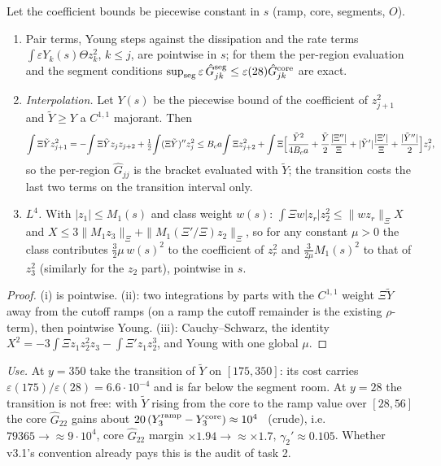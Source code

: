 \documentclass[11pt]{article}
\theoremstyle{definition}\newtheorem{definition}[theorem]{Definition}
\theoremstyle{remark}\newtheorem{remark}[theorem]{Remark}
\begin{document}
\begin{lemma}\label{lem:loc}
Let the coefficient bounds be piecewise constant in $s$ (ramp, core, segments, $O$).
\begin{enumerate}[label=(\roman*),leftmargin=2em,itemsep=2pt]
\item Pair terms, Young steps against the dissipation and the rate terms $\int\varepsilon Y_k(s)\Theta z_k^2$, $k\le j$, are pointwise in $s$; for them the per-region evaluation and the segment conditions $\sup_{\rm seg}\varepsilon\,\hat G^{\rm seg}_{jk}\le\varepsilon(28)\hat G^{\rm core}_{jk}$ are exact.
\item \emph{Interpolation.} Let $Y(s)$ be the piecewise bound of the coefficient of $z_{j+1}^2$ and $\tilde Y\ge Y$ a $C^{1,1}$ majorant. Then
\[
\int\Xi\tilde Yz_{j+1}^2=-\!\int\Xi\tilde Yz_jz_{j+2}+\tfrac12\!\int(\Xi\tilde Y)''z_j^2\le B_ca\!\int\Xi z_{j+2}^2+\int\Xi\Bigl[\frac{\tilde Y^2}{4B_ca}+\frac{\tilde Y}2\frac{|\Xi''|}{\Xi}+|\tilde Y'|\frac{|\Xi'|}{\Xi}+\frac{|\tilde Y''|}2\Bigr]z_j^2 ,
\]
so the per-region $\hat G_{jj}$ is the bracket evaluated with $\tilde Y$; the transition costs the last two terms on the transition interval only.
\item \emph{$L^4$.} With $|z_1|\le M_1(s)$ and class weight $w(s)$: $\int\Xi w|z_r|z_2^2\le\|wz_r\|_\Xi X$ and $X\le3\|M_1z_3\|_\Xi+\|M_1(\Xi'/\Xi)z_2\|_\Xi$, so for any constant $\mu>0$ the class contributes $\frac32\mu\,w(s)^2$ to the coefficient of $z_r^2$ and $\frac3{2\mu}M_1(s)^2$ to that of $z_3^2$ \textup{(}similarly for the $z_2$ part\textup{)}, pointwise in $s$.
\end{enumerate}
\end{lemma}
\begin{proof}
(i) is pointwise. (ii): two integrations by parts with the $C^{1,1}$ weight $\Xi\tilde Y$ away from the cutoff ramps (on a ramp the cutoff remainder is the existing $\rho$-term), then pointwise Young. (iii): Cauchy--Schwarz, the identity $X^2=-3\int\Xi z_1z_2^2z_3-\int\Xi'z_1z_2^3$, and Young with one global $\mu$.
\end{proof}
\noindent\emph{Use.} At $y=350$ take the transition of $\tilde Y$ on $[175,350]$: its cost carries $\varepsilon(175)/\varepsilon(28)=6.6\cdot10^{-4}$ and is far below the segment room. At $y=28$ the transition is not free: with $\tilde Y$ rising from the core to the ramp value over $[28,56]$ the core $\hat G_{22}$ gains about $20\,(Y^{\rm ramp}_3-Y^{\rm core}_3)\approx10^4$ \tE\ (crude), i.e.\ $79365\to\approx9\cdot10^4$, core $\hat G_{22}$ margin $\times1.94\to\approx\times1.7$, $\gamma_2'\approx0.105$. Whether v3.1's convention already pays this is the audit of task 2.
\end{document}
